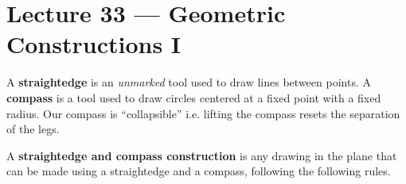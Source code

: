 \section{Lecture 33 — Geometric Constructions I}

\begin{definition}
	A \textbf{straightedge} is an \textit{unmarked} tool used to draw lines between points. A \textbf{compass} is a tool used to draw circles centered at a fixed point with a fixed radius. Our compass is ``collapsible'' i.e. lifting the compass resets the separation of the legs.

	A \textbf{straightedge and compass construction} is any drawing in the plane that can be made using a straightedge and a compass, following the following rules.
\end{definition}

